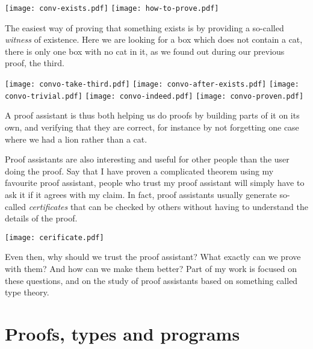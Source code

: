 \begin{center}
  \texttt{[image: conv-exists.pdf]}
  \texttt{[image: how-to-prove.pdf]}
\end{center}

The easiest way of proving that something exists is by providing a so-called
\emph{witness} of existence. Here we are looking for a box which does not
contain a cat, there is only one box with no cat in it, as we found out during
our previous proof, the third.

\begin{center}
  \texttt{[image: convo-take-third.pdf]}
  \texttt{[image: convo-after-exists.pdf]}
  \texttt{[image: convo-trivial.pdf]}
  \texttt{[image: convo-indeed.pdf]}
  \texttt{[image: convo-proven.pdf]}
\end{center}

A proof assistant is thus both helping us do proofs by building parts of it on
its own, and verifying that they are correct, for instance by not forgetting one
case where we had a lion rather than a cat.

Proof assistants are also interesting and useful for other people than the user
doing the proof. Say that I have proven a complicated theorem using my favourite
proof assistant, people who trust my proof assistant will simply have to ask it
if it agrees with my claim.
In fact, proof assistants usually generate so-called \emph{certificates} that
can be checked by others without having to understand the details of the proof.
\begin{center}
  \texttt{[image: cerificate.pdf]}
\end{center}

Even then, why should we trust the proof assistant? What exactly can we prove
with them? And how can we make them better?
Part of my work is focused on these questions, and on the study of proof
assistants based on something called type theory.

\section{Proofs, types and programs}

